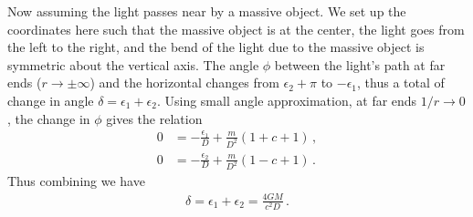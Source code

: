 \documentclass[11pt, onesided]{book}
\theoremstyle{break}
\theoremstyle{break}
\begin{document}
Now assuming the light passes  near by a massive object. We set up the coordinates here such that the massive object is at the center, the light goes from the left to the right, and the bend of the light due to the massive object is symmetric about the vertical axis. The angle $\phi$ between the light's path at far ends ($r \to \pm \infty$) and the horizontal changes from $\epsilon_2 + \pi$ to $-\epsilon_1$, thus a total of change in angle $\delta = \epsilon_1 + \epsilon_2$. Using small angle approximation, at far ends $1/r\to 0$, the change in $\phi$ gives the relation
\begin{align*}
0 &= -\frac{\epsilon_1}{D} + \frac{m}{D^2}\left( 1 + c+ 1\right) \,,\\
0 &= -\frac{\epsilon_2}{D} + \frac{m}{D^2}\left( 1 - c + 1\right)\,.
\end{align*}
Thus combining we have
\begin{align*}
\delta = \epsilon_1  + \epsilon_2 = \frac{4GM}{c^2 D}\,.
\end{align*}
\end{document}
